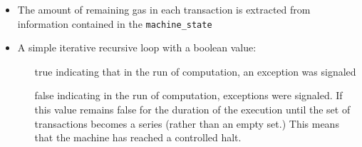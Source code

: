 \documentclass[10pt,a4paper,oneside]{scrartcl}
\begin{document}
\begin{itemize}
	\item The amount of remaining gas in each transaction is extracted from information contained in the \texttt{machine\_state} 
	\item A simple iterative recursive  loop\supercite{Wood2017} with a boolean  value: 
		\begin{itemize}
		\item	[true] indicating that in the run of computation, an exception was signaled
		\item	[false] indicating in the run of computation, exceptions were signaled. If this value remains false for the duration of the execution until the set of transactions becomes a series (rather than an empty set.) This means that the machine has reached a controlled halt. 
		\end{itemize}
\end{itemize}


\printbibliography
\end{document}
